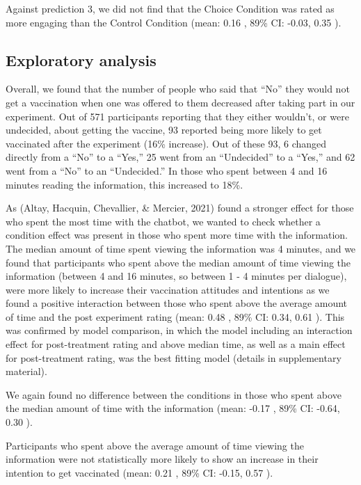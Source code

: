 \documentclass[
  english,
  ,jou,floatsintext]{apa6}
\begin{document}
Against prediction 3, we did not find that the Choice Condition was rated as more engaging than the Control Condition (mean: 0.16 , 89\% CI: -0.03, 0.35 ).

\hypertarget{exploratory-analysis}{%
\subsection{Exploratory analysis}\label{exploratory-analysis}}

Overall, we found that the number of people who said that ``No'' they would not get a vaccination when one was offered to them decreased after taking part in our experiment. Out of 571 participants reporting that they either wouldn't, or were undecided, about getting the vaccine, 93 reported being more likely to get vaccinated after the experiment (16\% increase). Out of these 93, 6 changed directly from a ``No'' to a ``Yes,'' 25 went from an ``Undecided'' to a ``Yes,'' and 62 went from a ``No'' to an ``Undecided.'' In those who spent between 4 and 16 minutes reading the information, this increased to 18\%.

As (Altay, Hacquin, Chevallier, \& Mercier, 2021) found a stronger effect for those who spent the most time with the chatbot, we wanted to check whether a condition effect was present in those who spent more time with the information. The median amount of time spent viewing the information was 4 minutes, and we found that participants who spent above the median amount of time viewing the information (between 4 and 16 minutes, so between 1 - 4 minutes per dialogue), were more likely to increase their vaccination attitudes and intentions as we found a positive interaction between those who spent above the average amount of time and the post experiment rating (mean: 0.48 , 89\% CI: 0.34, 0.61 ). This was confirmed by model comparison, in which the model including an interaction effect for post-treatment rating and above median time, as well as a main effect for post-treatment rating, was the best fitting model (details in supplementary material).

We again found no difference between the conditions in those who spent above the median amount of time with the information (mean: -0.17 , 89\% CI: -0.64, 0.30 ).

Participants who spent above the average amount of time viewing the information were not statistically more likely to show an increase in their intention to get vaccinated (mean: 0.21 , 89\% CI: -0.15, 0.57 ).
\end{document}
